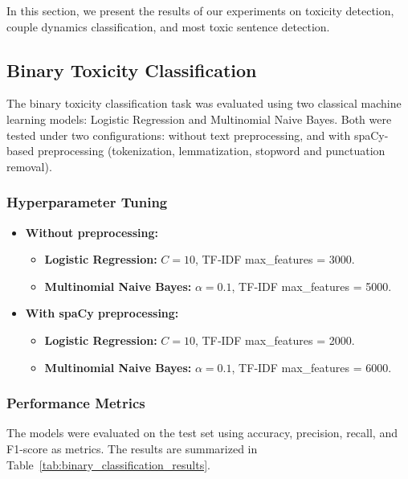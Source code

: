 \documentclass[conference]{IEEEtran}
\begin{document}
In this section, we present the results of our experiments on toxicity detection, couple dynamics classification, and most toxic sentence detection.

\subsection{Binary Toxicity Classification}

The binary toxicity classification task was evaluated using two classical machine learning models: Logistic Regression and Multinomial Naive Bayes. Both were tested under two configurations: without text preprocessing, and with spaCy-based preprocessing (tokenization, lemmatization, stopword and punctuation removal).

\subsubsection{Hyperparameter Tuning}

\begin{itemize}
  \item \textbf{Without preprocessing:}
    \begin{itemize}
      \item \textbf{Logistic Regression:} $C = 10$, TF‑IDF max\_features = 3000.
      \item \textbf{Multinomial Naive Bayes:} $\alpha = 0.1$, TF‑IDF max\_features = 5000.
    \end{itemize}
  \item \textbf{With spaCy preprocessing:}
    \begin{itemize}
      \item \textbf{Logistic Regression:} $C = 10$, TF‑IDF max\_features = 2000.
      \item \textbf{Multinomial Naive Bayes:} $\alpha = 0.1$, TF‑IDF max\_features = 6000.
    \end{itemize}
\end{itemize}

\subsubsection{Performance Metrics}
\noindent

The models were evaluated on the test set using accuracy, precision, recall, and F1-score as metrics. The results are summarized in Table~\ref{tab:binary_classification_results}.
\end{document}

